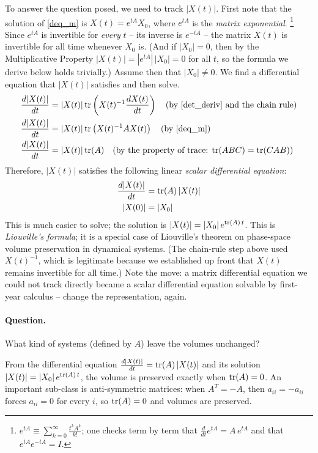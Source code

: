 \documentclass{article}
\begin{document}
To answer the question posed,
we need to track $|X(t)|$. First note that the solution of \eqref{deq_m} is
$X(t) = e^{tA} X_0$, where $e^{tA}$ is the {\em matrix exponential\/}.%
\footnote{$e^{tA} \equiv \sum_{k=0}^\infty \frac{t^k A^k}{k!}$; one checks
term by term that $\frac{d}{dt} e^{tA} = A \, e^{tA}$ and that
$e^{tA} e^{-tA} = I$.}
Since $e^{tA}$ is invertible for {\em every\/} $t$ -- its inverse is
$e^{-tA}$ -- the matrix $X(t)$ is invertible for all time whenever $X_0$ is.
(And if $|X_0| = 0$, then by the Multiplicative Property
$|X(t)| = |e^{tA}| \, |X_0| = 0$ for all $t$, so the formula we derive below
holds trivially.) Assume then that $|X_0| \neq 0$.
We find a differential equation
that $|X(t)|$ satisfies and then solve.
\begin{align*}
  \frac{d |X(t)|}{dt} &= |X(t)| \, {\rm tr}\left(X(t)^{-1} \frac{d X(t)}{dt}\right)
  \quad \text{(by \eqref{det_deriv} and the chain rule)} \\
  \frac{d |X(t)|}{dt} &= |X(t)| \, {\rm tr}\left(X(t)^{-1} A X(t)\right) \quad
  \text{(by \eqref{deq_m})} \\
  \frac{d |X(t)|}{dt} &= |X(t)| \, {\rm tr}(A) \quad
  \text{(by the property of trace: ${\rm tr}(ABC) = {\rm tr}(CAB)$)}
\end{align*}
Therefore, $|X(t)|$ satisfies the following linear {\em scalar differential equation\/}:
\begin{align}
  \frac{d |X(t)|}{dt} &= {\rm tr}(A) \, |X(t)| \\
  |X(0)| &= |X_0|
\end{align}
This is much easier to solve; the solution is $|X(t)| = |X_0| \, e^{{\rm tr}(A)\, t}$.
This is {\em Liouville's formula\/}; it is a special case of Liouville's theorem
on phase-space volume preservation in dynamical systems. (The chain-rule step
above used $X(t)^{-1}$, which is legitimate because we established up front
that $X(t)$ remains invertible for all time.) Note the move: a matrix
differential equation we could not track directly became a scalar differential
equation solvable by first-year calculus -- change the representation, again.

\paragraph{Question.} What kind of systems (defined by $A$) leave the volumes unchanged?

From the differential equation
$\frac{d|X(t)|}{dt} = {\rm tr}(A)\,|X(t)|$ and its solution
$|X(t)| = |X_0|\,e^{{\rm tr}(A)\,t}$,
the volume is preserved exactly when ${\rm tr}(A) = 0$. An important sub-class
is anti-symmetric matrices: when $A^T = -A$, then $a_{ii} = -a_{ii}$ forces
$a_{ii} = 0$ for every $i$, so ${\rm tr}(A) = 0$ and volumes are preserved.
\end{document}
